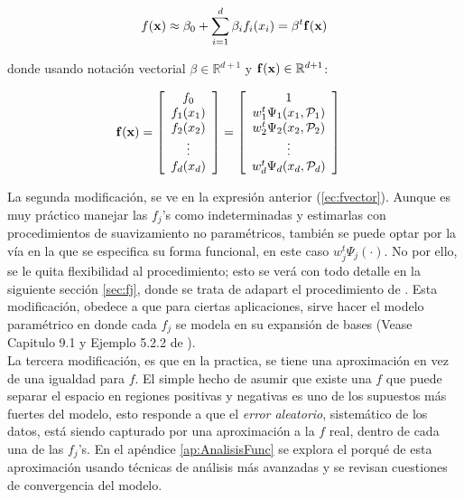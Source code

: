 \documentclass[../Main/Main.tex]{subfiles}
\begin{document}
$$
f(\mathbf{x}) \approx \beta_0 +\sum_{i=1}^d \beta_i f_i(x_i) = \beta^t \mathbf{f}(\mathbf{x})
$$

donde usando notación vectorial $\beta\in\mathbb{R}^{d+1}$ y 
$\mathbf{f}(\mathbf{x}) \in\mathbb{R}^{d+1}$:

\begin{align}
\mathbf{f}(\mathbf{x}) &=  
\left[
	\begin{array}{c} 
	f_0 \\
	f_1(x_1) \\
	f_2(x_2) \\
	\vdots   \\
	f_d(x_d)
	\end{array}
\right]
	=
\left[
	\begin{array}{c} 
	1 \\
 	w_1^t\Psi_1(x_1,\mathcal{P}_1)\\
 	w_2^t\Psi_2(x_2,\mathcal{P}_2)\\
	\vdots   \\
 	w_d^t\Psi_d(x_d,\mathcal{P}_d)\\
	\end{array}
\right]	\label{ec:fvector}
\end{align} 

La segunda modificación, se ve en la expresión anterior (\ref{ec:fvector}). Aunque es muy práctico manejar las $f_j$'s como indeterminadas y estimarlas con procedimientos de suavizamiento no paramétricos, también se puede optar por la vía en la que se especifica su forma funcional, en este caso $w_j^t\Psi_j(\cdot)$.
No por ello, se le quita flexibilidad al procedimiento; esto se verá con todo detalle en la siguiente sección \ref{sec:fj}, donde se trata de adapart el procedimiento de \autocite{mallik1998automatic}. Esta modificación, obedece a que para ciertas aplicaciones, sirve hacer el modelo paramétrico en donde cada $f_j$ se modela en su expansión de bases (Vease Capitulo 9.1 y Ejemplo 5.2.2 de \autocite{hastie2008elements}).\\

La tercera modificación, es que en la practica, se tiene una aproximación en vez de una igualdad para $f$. El simple hecho de asumir que existe una $f$ que puede separar el espacio en regiones positivas y negativas es uno de los supuestos más fuertes del modelo, esto responde a que el \textit{error aleatorio}, sistemático de los datos, está siendo capturado por una aproximación a la $f$ real, dentro de cada una de las $f_j$'s. En el apéndice \ref{ap:AnalisisFunc} se explora el porqué de esta aproximación usando técnicas de análisis más avanzadas y se revisan cuestiones de convergencia del modelo.\\
\end{document}

